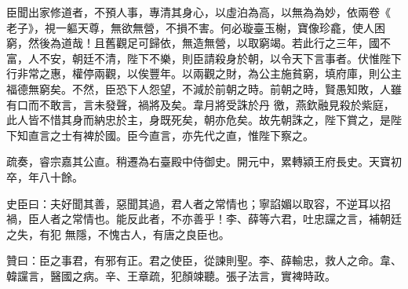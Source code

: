 \begin{pinyinscope}
 臣聞出家修道者，不預人事，專清其身心，以虛泊為高，以無為為妙，依兩卷《
 老子》，視一軀天尊，無欲無營，不損不害。何必璇臺玉榭，寶像珍龕，使人困窮，然後為道哉！且舊觀足可歸依，無造無營，以取窮竭。若此行之三年，國不富，人不安，朝廷不清，陛下不樂，則臣請殺身於朝，以令天下言事者。伏惟陛下行非常之惠，權停兩觀，以俟豐年。以兩觀之財，為公主施貧窮，填府庫，則公主福德無窮矣。不然，臣恐下人怨望，不減於前朝之時。前朝之時，賢愚知敗，人雖有口而不敢言，言未發聲，禍將及矣。韋月將受誅於丹
 徼，燕欽融見殺於紫庭，此人皆不惜其身而納忠於主，身既死矣，朝亦危矣。故先朝誅之，陛下賞之，是陛下知直言之士有裨於國。臣今直言，亦先代之直，惟陛下察之。



 疏奏，睿宗嘉其公直。稍遷為右臺殿中侍御史。開元中，累轉潁王府長史。天寶初卒，年八十餘。



 史臣曰：夫好聞其善，惡聞其過，君人者之常情也；寧諂媚以取容，不逆耳以招禍，臣人者之常情也。能反此者，不亦善乎！李、薛等六君，吐忠讜之言，補朝廷之失，有犯
 無隱，不愧古人，有唐之良臣也。



 贊曰：臣之事君，有邪有正。君之使臣，從諫則聖。李、薛輸忠，救人之命。韋、韓讜言，醫國之病。辛、王章疏，犯顏竦聽。張子法言，實裨時政。



\end{pinyinscope}